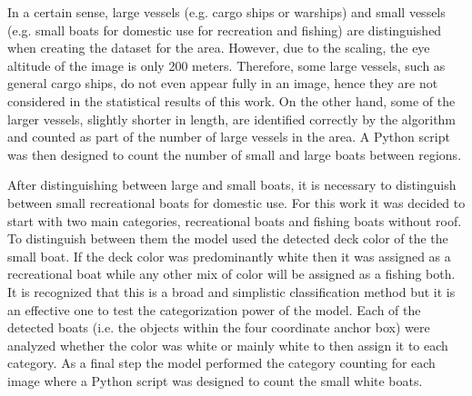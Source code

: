 In a certain sense, large vessels (e.g. cargo ships or warships) and small vessels (e.g. small boats for domestic use for recreation and fishing) are distinguished when creating the dataset for the area. However, due to the scaling, the eye altitude of the image is only 200 meters. Therefore, some large vessels, such as general cargo ships, do not even appear fully in an image, hence they are not considered in the statistical results of this work. On the other hand, some of the larger vessels, slightly shorter in length, are identified correctly by the algorithm and counted as part of the number of large vessels in the area. A Python script was then designed to count the number of small and large boats between regions.

After distinguishing between large and small boats, it is necessary to distinguish between small recreational boats for domestic use. For this work it was decided to start with two main categories, recreational boats and fishing boats without roof. To distinguish between them the model used the detected deck color of the the small boat. If the deck color was predominantly white then it was assigned as a recreational boat while any other mix of color will be assigned as a fishing both. It is recognized that this is a broad and simplistic classification method but it is an effective one to test the categorization power of the model. Each of the detected boats (i.e. the objects within the four coordinate anchor box) were analyzed whether the color was white or mainly white to then assign it to each category. As a final step the model performed the category counting for each image where a Python script was designed to count the small white boats.
